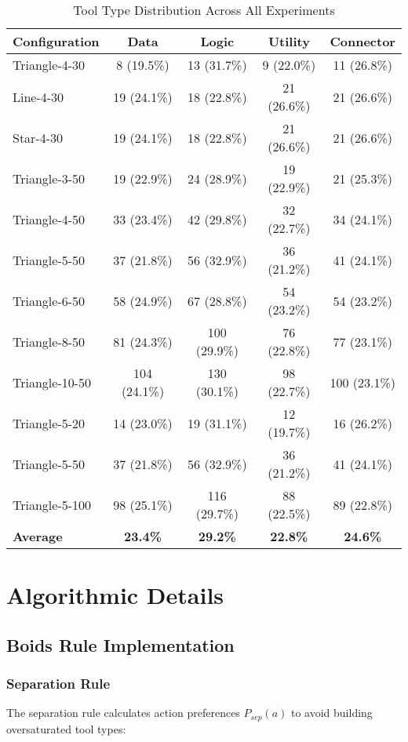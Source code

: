 \documentclass[10pt]{article}
\begin{document}
\begin{table}[H]
\centering
\caption{Tool Type Distribution Across All Experiments}
\begin{tabular}{@{}lcccc@{}}
\toprule
\textbf{Configuration} & \textbf{Data} & \textbf{Logic} & \textbf{Utility} & \textbf{Connector} \\
\midrule
Triangle-4-30 & 8 (19.5\%) & 13 (31.7\%) & 9 (22.0\%) & 11 (26.8\%) \\
Line-4-30 & 19 (24.1\%) & 18 (22.8\%) & 21 (26.6\%) & 21 (26.6\%) \\
Star-4-30 & 19 (24.1\%) & 18 (22.8\%) & 21 (26.6\%) & 21 (26.6\%) \\
Triangle-3-50 & 19 (22.9\%) & 24 (28.9\%) & 19 (22.9\%) & 21 (25.3\%) \\
Triangle-4-50 & 33 (23.4\%) & 42 (29.8\%) & 32 (22.7\%) & 34 (24.1\%) \\
Triangle-5-50 & 37 (21.8\%) & 56 (32.9\%) & 36 (21.2\%) & 41 (24.1\%) \\
Triangle-6-50 & 58 (24.9\%) & 67 (28.8\%) & 54 (23.2\%) & 54 (23.2\%) \\
Triangle-8-50 & 81 (24.3\%) & 100 (29.9\%) & 76 (22.8\%) & 77 (23.1\%) \\
Triangle-10-50 & 104 (24.1\%) & 130 (30.1\%) & 98 (22.7\%) & 100 (23.1\%) \\
Triangle-5-20 & 14 (23.0\%) & 19 (31.1\%) & 12 (19.7\%) & 16 (26.2\%) \\
Triangle-5-50 & 37 (21.8\%) & 56 (32.9\%) & 36 (21.2\%) & 41 (24.1\%) \\
Triangle-5-100 & 98 (25.1\%) & 116 (29.7\%) & 88 (22.5\%) & 89 (22.8\%) \\
\midrule
\textbf{Average} & \textbf{23.4\%} & \textbf{29.2\%} & \textbf{22.8\%} & \textbf{24.6\%} \\
\bottomrule
\end{tabular}
\end{table}

\section{Algorithmic Details}

\subsection{Boids Rule Implementation}

\subsubsection{Separation Rule}
The separation rule calculates action preferences $P_{sep}(a)$ to avoid building oversaturated tool types:
\end{document}
